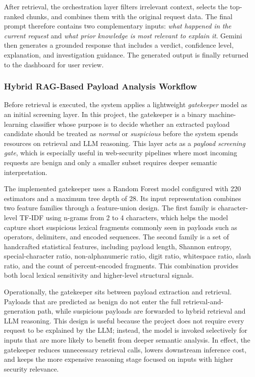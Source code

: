 After retrieval, the orchestration layer filters irrelevant context, selects the top-ranked chunks, and combines them with the original request data. The final prompt therefore contains two complementary inputs: \textit{what happened in the current request} and \textit{what prior knowledge is most relevant to explain it}. Gemini then generates a grounded response that includes a verdict, confidence level, explanation, and investigation guidance. The generated output is finally returned to the dashboard for user review.

\clearpage
\subsubsection{Hybrid RAG-Based Payload Analysis Workflow}

Before retrieval is executed, the system applies a lightweight \textit{gatekeeper} model as an initial screening layer. In this project, the gatekeeper is a binary machine-learning classifier whose purpose is to decide whether an extracted payload candidate should be treated as \textit{normal} or \textit{suspicious} before the system spends resources on retrieval and LLM reasoning. This layer acts as a \textit{payload screening gate}, which is especially useful in web-security pipelines where most incoming requests are benign and only a smaller subset requires deeper semantic interpretation.

The implemented gatekeeper uses a Random Forest model configured with 220 estimators and a maximum tree depth of 28. Its input representation combines two feature families through a feature-union design. The first family is character-level TF-IDF using n-grams from 2 to 4 characters, which helps the model capture short suspicious lexical fragments commonly seen in payloads such as operators, delimiters, and encoded sequences. The second family is a set of handcrafted statistical features, including payload length, Shannon entropy, special-character ratio, non-alphanumeric ratio, digit ratio, whitespace ratio, slash ratio, and the count of percent-encoded fragments. This combination provides both local lexical sensitivity and higher-level structural signals.

Operationally, the gatekeeper sits between payload extraction and retrieval. Payloads that are predicted as benign do not enter the full retrieval-and-generation path, while suspicious payloads are forwarded to hybrid retrieval and LLM reasoning. This design is useful because the project does not require every request to be explained by the LLM; instead, the model is invoked selectively for inputs that are more likely to benefit from deeper semantic analysis. In effect, the gatekeeper reduces unnecessary retrieval calls, lowers downstream inference cost, and keeps the more expensive reasoning stage focused on inputs with higher security relevance.


